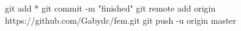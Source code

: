 git add *
git commit -m "finished"
git remote add origin https://github.com/Gabydc/fem.git
git push -u origin master
